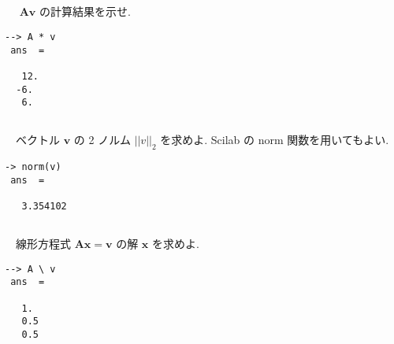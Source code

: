 \documentclass{jarticle}
\begin{document}
\subsection{}
\label{sec:org6c60d0d}
　 \(\bm{A}\bm{v}\) の計算結果を示せ.\\
\begin{verbatim}
--> A * v
 ans  =

   12.
  -6.
   6.
\end{verbatim}

\subsection{}
\label{sec:orge5d0b42}
　ベクトル \(\bm{v}\) の 2 ノルム \(||v||_2\) を求めよ. Scilab の norm 関数を用いてもよい.\\
\begin{verbatim}
-> norm(v)
 ans  =

   3.354102
\end{verbatim}
\subsection{}
\label{sec:org469c61e}
　線形方程式 \(\bm{A}\bm{x} = \bm{v}\) の解 \(\bm{x}\) を求めよ.\\
\begin{verbatim}
--> A \ v
 ans  =

   1.
   0.5
   0.5
\end{verbatim}
\end{document}
